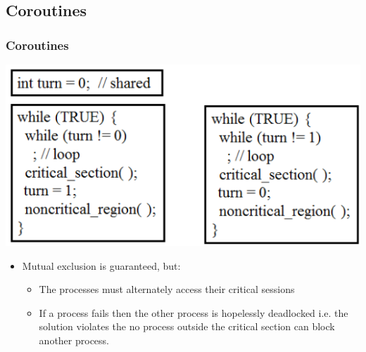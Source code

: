 \documentclass{beamer}
\begin{document}
\subsection{Coroutines}
\begin{frame}
\frametitle{Coroutines}
\includegraphics[scale=0.35]{coroute.png}
\begin{itemize}
\item Mutual exclusion is guaranteed, but:
\begin{itemize}
\item The processes must alternately access their critical sessions
\item If a process fails then the other process is hopelessly deadlocked i.e. the solution violates the no process outside the critical section can block another process.
\end{itemize}
\end{itemize}
\end{frame}
\end{document}
